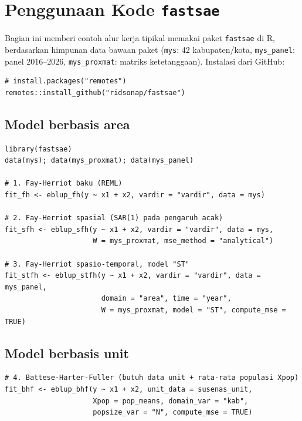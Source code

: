\documentclass[11pt,a4paper]{article}
\theoremstyle{definition}
\begin{document}
\section{Penggunaan Kode \texttt{fastsae}}

Bagian ini memberi contoh alur kerja tipikal memakai paket \texttt{fastsae} di R,
berdasarkan himpunan data bawaan paket (\texttt{mys}: 42 kabupaten/kota,
\texttt{mys\_panel}: panel 2016--2026, \texttt{mys\_proxmat}: matriks ketetanggaan).
Instalasi dari GitHub:

\begin{verbatim}
# install.packages("remotes")
remotes::install_github("ridsonap/fastsae")
\end{verbatim}

\subsection{Model berbasis area}

\begin{verbatim}
library(fastsae)
data(mys); data(mys_proxmat); data(mys_panel)

# 1. Fay-Herriot baku (REML)
fit_fh <- eblup_fh(y ~ x1 + x2, vardir = "vardir", data = mys)

# 2. Fay-Herriot spasial (SAR(1) pada pengaruh acak)
fit_sfh <- eblup_sfh(y ~ x1 + x2, vardir = "vardir", data = mys,
                     W = mys_proxmat, mse_method = "analytical")

# 3. Fay-Herriot spasio-temporal, model "ST"
fit_stfh <- eblup_stfh(y ~ x1 + x2, vardir = "vardir", data = mys_panel,
                       domain = "area", time = "year",
                       W = mys_proxmat, model = "ST", compute_mse = TRUE)
\end{verbatim}

\subsection{Model berbasis unit}

\begin{verbatim}
# 4. Battese-Harter-Fuller (butuh data unit + rata-rata populasi Xpop)
fit_bhf <- eblup_bhf(y ~ x1 + x2, unit_data = susenas_unit,
                     Xpop = pop_means, domain_var = "kab",
                     popsize_var = "N", compute_mse = TRUE)
\end{verbatim}
\end{document}
